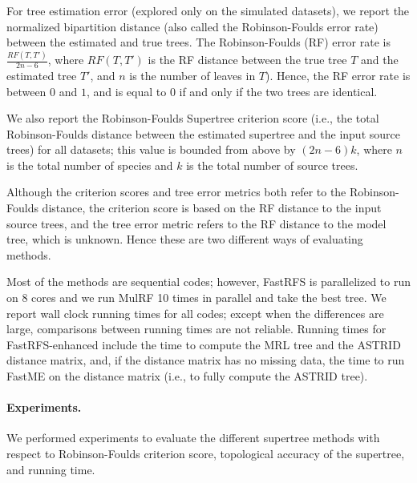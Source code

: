 For tree estimation error (explored only on the simulated
datasets), we
report the normalized bipartition distance (also
called the Robinson-Foulds error rate) between the
estimated and true trees.
The
Robinson-Foulds  (RF) error rate is
 $\frac{RF(T,T')}{2n-6}$, where $RF(T,T')$ is the RF distance between the true tree $T$ and the estimated tree $T'$, and $n$ is the number of leaves in $T$). 
Hence, the RF error rate is  between $0$ and $1$, and is equal to $0$ if and only if the two trees are identical. 

We also report the Robinson-Foulds Supertree criterion
score (i.e., the total Robinson-Foulds distance between the
estimated supertree
and the input source trees) for all datasets;
this value is bounded from
above by $(2n-6)k$, where $n$ is the total number of species and $k$ is the total number of source trees.

Although the criterion scores and tree error metrics both refer
to the Robinson-Foulds distance, the criterion score is based
on the RF distance to the input source trees, and the
tree error metric refers to the RF distance to the model  tree, which is unknown.
Hence these are two different ways of evaluating  methods.


Most of the methods are sequential codes; however, FastRFS is
parallelized to run on 8 cores and we run MulRF 10 times in parallel
and take the best tree.  We report wall clock running times for all
codes; except when the differences are large, comparisons between
running times are not reliable. Running times for FastRFS-enhanced
include the time to compute the MRL tree
and the ASTRID distance matrix, and, if the 
distance matrix has no missing data,   the time to run
FastME on the distance matrix (i.e., to fully compute the
ASTRID tree).

\paragraph{\bf Experiments.  }
We performed  experiments to evaluate the 
different supertree methods with respect to  
Robinson-Foulds criterion score,  topological accuracy of the supertree, and  
running time. 

